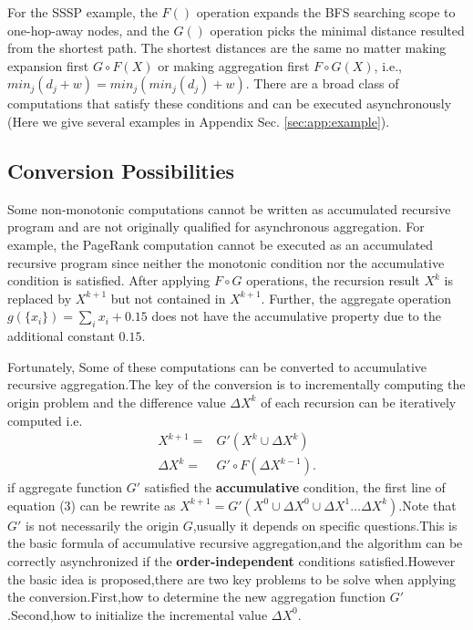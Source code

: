 For the SSSP example, the $F()$ operation expands the BFS searching scope to one-hop-away nodes, and the $G()$ operation picks the minimal distance resulted from the shortest path. The shortest distances are the same no matter making expansion first $G\circ F(X)$ or making aggregation first $F\circ G(X)$, i.e., $min_j(d_j+w)=min_j(min_j(d_j)+w)$. There are a broad class of computations that satisfy these conditions and can be executed asynchronously (Here we give several examples in Appendix Sec. \ref{sec:app:example}).


\subsection{Conversion Possibilities}
\label{sec:async:convert}

Some non-monotonic computations cannot be written as accumulated recursive program and are not originally qualified for asynchronous aggregation. For example, the PageRank computation cannot be executed as an accumulated recursive program since neither the monotonic condition nor the accumulative condition is satisfied. After applying $F\circ G$ operations, the recursion result $X^{k}$ is replaced by $X^{k+1}$ but not contained in $X^{k+1}$. Further, the aggregate operation $g(\{x_i\})=\sum_i{x_i}+0.15$ does not have the accumulative property due to the additional constant $0.15$.

Fortunately, Some of these computations can be converted to accumulative recursive aggregation.The key of the conversion is to incrementally computing the origin problem and the difference value $\Delta X^k$ of each recursion can be iteratively computed i.e.
\begin{equation}
\begin{aligned}
X^{k+1}=&G'(X^{k}\cup \Delta X^{k})\\
\Delta X^{k}=&G' \circ F(\Delta X^{k-1}).
\end{aligned}
\end{equation}
if aggregate function $G'$ satisfied the \textbf{accumulative} condition, the first line of equation (3) can be rewrite as $X^{k+1}=G'(X^0\cup \Delta X^0\cup \Delta X^1 \ldots \Delta X^k)$.Note that $G'$ is not necessarily the origin $G$,usually it depends on specific questions.This is the basic formula of accumulative recursive aggregation,and the algorithm can be correctly asynchronized if the \textbf{order-independent} conditions satisfied.However the basic idea is proposed,there are two key problems to be solve when applying the conversion.First,how to determine the new aggregation function $G'$ .Second,how to initialize the incremental value $\Delta X^0$.  

